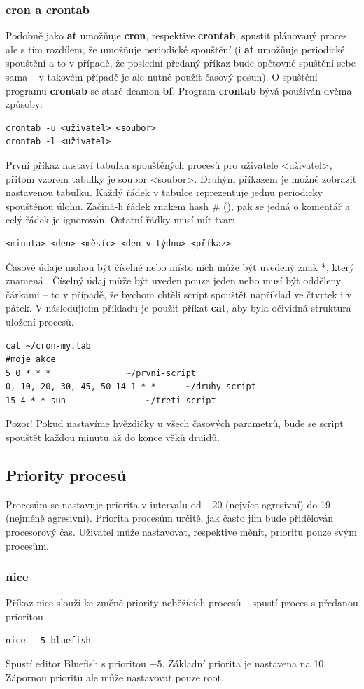 \documentclass{article}
\begin{document}
\subsubsection{cron a crontab}
Podobně jako \textbf{at} umožňuje \textbf{cron}, respektive \textbf{crontab}, spustit plánovaný proces ale s tím rozdílem, že umožňuje periodické spouštění (i \textbf{at} umožňuje periodické spouštění a to v případě, že poslední předaný příkaz bude opětovné spuštění sebe sama -- v takovém případě je ale nutné použít časový posun). O spuštění programu \textbf{crontab} se staré deamon \textbf{bf}. Program \textbf{crontab} bývá používán dvěma způsoby:
\begin{verbatim}
crontab -u <uživatel> <soubor>
crontab -l <uživatel>
\end{verbatim}
První příkaz nastaví tabulku spouštěných procesů pro uživatele \textless uživatel\textgreater, přitom vzorem tabulky je soubor \textless soubor\textgreater. Druhým příkazem je možné zobrazit nastavenou tabulku. Každý řádek v tabulce reprezentuje jednu periodicky spouštěnou úlohu. Začíná-li řádek znakem hash \# (), pak se jedná o komentář a celý řádek je ignorován. Ostatní řádky musí mít tvar:
\begin{verbatim}
<minuta> <den> <měsíc> <den v týdnu> <příkaz>
\end{verbatim}
Časové údaje mohou být číselné nebo místo nich může být uvedený znak *, který znamená . Číselný údaj může být uveden pouze jeden nebo musí být odděleny čárkami -- to v případě, že bychom chtěli script spouštět například ve čtvrtek i v pátek. V následujícím příkladu je použit příkat \textbf{cat}, aby byla očividná struktura uložení procesů.
\begin{verbatim}
cat ~/cron-my.tab
#moje akce
5 0 * * *				~/prvni-script
0, 10, 20, 30, 45, 50 14 1 * * 		~/druhy-script
15 4 * * sun				~/treti-script
\end{verbatim}
Pozor! Pokud nastavíme hvězdičky u všech časových parametrů, bude se script spouštět každou minutu až do konce věků druidů.

\subsection{Priority procesů}
Procesům se nastavuje priorita v intervalu od $-20$ (nejvíce agresivní) do 19 (nejméně agresivní). Priorita procesům určitě, jak často jim bude přidělován procesorový čas. Uživatel může nastavovat, respektive měnit, prioritu pouze svým procesům.
\subsubsection{nice}
Příkaz nice slouží ke změně priority neběžících procesů -- spustí proces s předanou prioritou
\begin{verbatim}
nice --5 bluefish
\end{verbatim}
Spustí editor Bluefish s prioritou $-5$. Základní priorita je nastavena na 10. Zápornou prioritu ale může nastavovat pouze root. 
\end{document}
